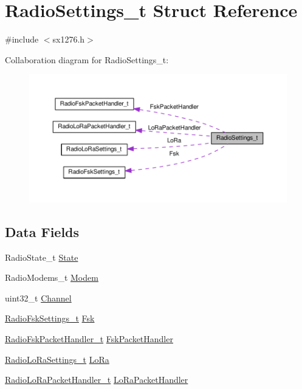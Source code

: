 \hypertarget{structRadioSettings__t}{}\section{Radio\+Settings\+\_\+t Struct Reference}
\label{structRadioSettings__t}


{\ttfamily \#include $<$sx1276.\+h$>$}



Collaboration diagram for Radio\+Settings\+\_\+t\+:
\nopagebreak
\begin{figure}[H]
\begin{center}
\leavevmode
\includegraphics[width=350pt]{structRadioSettings__t__coll__graph}
\end{center}
\end{figure}
\subsection*{Data Fields}
\begin{DoxyCompactItemize}
\item 
Radio\+State\+\_\+t \hyperlink{structRadioSettings__t_ad051d6eb4b33aa5a5027e84535821d63}{State}
\item 
Radio\+Modems\+\_\+t \hyperlink{structRadioSettings__t_a30e9dbea56513318361cffc63da1e4dc}{Modem}
\item 
uint32\+\_\+t \hyperlink{structRadioSettings__t_a7dff792a3ddef7633de17b2e41b8d074}{Channel}
\item 
\hyperlink{structRadioFskSettings__t}{Radio\+Fsk\+Settings\+\_\+t} \hyperlink{structRadioSettings__t_adc7c8d98b4b44e6483234246d6b67556}{Fsk}
\item 
\hyperlink{structRadioFskPacketHandler__t}{Radio\+Fsk\+Packet\+Handler\+\_\+t} \hyperlink{structRadioSettings__t_a72eaff1f3b89014d493768dd3c00f2d2}{Fsk\+Packet\+Handler}
\item 
\hyperlink{structRadioLoRaSettings__t}{Radio\+Lo\+Ra\+Settings\+\_\+t} \hyperlink{structRadioSettings__t_a36e1e4227a9444c96c670eb4343b1a16}{Lo\+Ra}
\item 
\hyperlink{structRadioLoRaPacketHandler__t}{Radio\+Lo\+Ra\+Packet\+Handler\+\_\+t} \hyperlink{structRadioSettings__t_a1a94014a708421cec9ff3095e5614784}{Lo\+Ra\+Packet\+Handler}
\end{DoxyCompactItemize}


